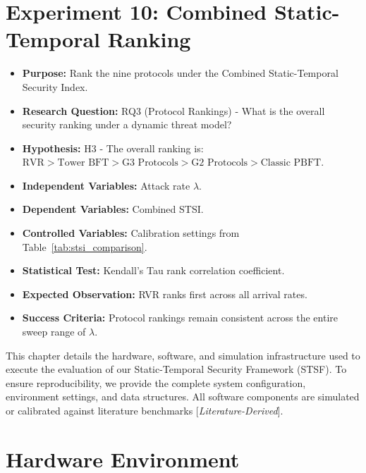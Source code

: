 \documentclass[12pt, oneside, a4paper]{report}
\theoremstyle{definition}
\theoremstyle{remark}
\newcommand{\litderived}{[\textit{Literature-Derived}]}
\begin{document}
\section{Experiment 10: Combined Static-Temporal Ranking}
\label{sec:ed:e10}
\begin{itemize}
  \item \textbf{Purpose:} Rank the nine protocols under the Combined Static-Temporal Security Index.
  \item \textbf{Research Question:} RQ3 (Protocol Rankings) - What is the overall security ranking under a dynamic threat model?
  \item \textbf{Hypothesis:} H3 - The overall ranking is: $\text{RVR} > \text{Tower BFT} > \text{G3 Protocols} > \text{G2 Protocols} > \text{Classic PBFT}$.
  \item \textbf{Independent Variables:} Attack rate $\lambda$.
  \item \textbf{Dependent Variables:} Combined STSI.
  \item \textbf{Controlled Variables:} Calibration settings from Table~\ref{tab:stsi_comparison}.
  \item \textbf{Statistical Test:} Kendall's Tau rank correlation coefficient.
  \item \textbf{Expected Observation:} RVR ranks first across all arrival rates.
  \item \textbf{Success Criteria:} Protocol rankings remain consistent across the entire sweep range of $\lambda$.
\end{itemize}




This chapter details the hardware, software, and simulation infrastructure used to execute the evaluation of our Static-Temporal Security Framework (STSF). To ensure reproducibility, we provide the complete system configuration, environment settings, and data structures. All software components are simulated or calibrated against literature benchmarks \litderived.

\section{Hardware Environment}
\label{sec:ei:hardware}
\end{document}
